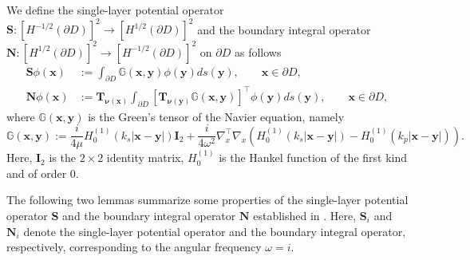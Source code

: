 \documentclass[11pt,reqno,twoside]{amsart}
\theoremstyle{definition}
\theoremstyle{remark}
\numberwithin{equation}{section}
\begin{document}
We define the single-layer potential operator $\mathbf{S}:\left[H^{-1/2}\left(\partial D\right) \right] ^2 \to \left[H^{1/2}\left(\partial D\right) \right] ^2$ and the boundary integral operator $\mathbf{N}:\left[H^{1/2}\left(\partial D\right) \right] ^2 \to \left[H^{-1/2}\left(\partial D\right) \right] ^2$ 
on $\partial D$ as follows
	\begin{align*}
		\mathbf S \phi \left( \mathbf x\right) &:= \int_{\partial D} \mathbb G \left( \mathbf x, \mathbf y\right) \phi\left(\mathbf y\right) ds\left( \mathbf y\right) , \qquad \mathbf x\in \partial D, \\%
		\mathbf N \phi \left( \mathbf x\right) &:=\mathbf T_{\bm{\nu}(\mathbf x)}\int_{\partial D} \left[\mathbf T_{\bm{\nu}(\mathbf y)}\mathbb G \left( \mathbf x, \mathbf y\right)\right]^{\top} \phi\left(\mathbf y\right) ds\left( \mathbf y\right) , \qquad \mathbf x\in \partial D,%
	\end{align*}
where $\mathbb G \left( \mathbf x, \mathbf y\right)$ is the Green's tensor of the Navier equation, namely
$$
\mathbb G \left( \mathbf x, \mathbf y\right):=\frac{i}{4\mu} H_0^{\left( 1\right) }\left( k_s|\mathbf x -\mathbf y|\right) \mathbf I_2 +\frac{i}{4\omega^2} \nabla_x^{\top} \nabla_x \left( H_0^{\left( 1\right) }\left( k_s|\mathbf x -\mathbf y|\right)-H_0^{\left( 1\right) }\left( k_p|\mathbf x -\mathbf y|\right)\right) .
$$
Here, $\mathbf I_2$ is the $2 \times 2$ identity matrix, $H_0^{\left( 1\right) }$ is the Hankel function of the first kind and of order 0.

The following two lemmas summarize some properties of the single-layer potential operator $\mathbf{S}$ and the boundary integral operator $\mathbf{N}$ established in \cite{Aren01,LLW25}. Here, $\mathbf{S}_i$  and $\mathbf{N}_i$ denote the single-layer potential operator and the boundary integral operator, respectively, corresponding to the angular frequency $\omega = i$.
	
\end{document}
